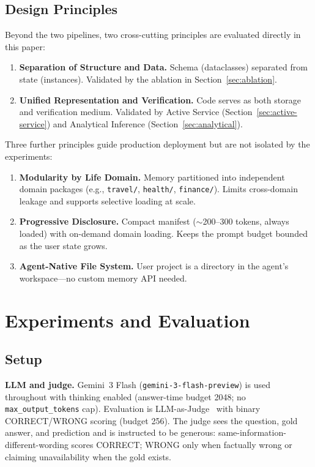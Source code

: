 \subsection{Design Principles}
\label{sec:principles}

Beyond the two pipelines, two cross-cutting principles are evaluated directly in this paper:

\begin{enumerate}[leftmargin=*]
\item \textbf{Separation of Structure and Data.} Schema (dataclasses) separated from state (instances). Validated by the ablation in Section~\ref{sec:ablation}.
\item \textbf{Unified Representation and Verification.} Code serves as both storage and verification medium. Validated by Active Service (Section~\ref{sec:active-service}) and Analytical Inference (Section~\ref{sec:analytical}).
\end{enumerate}

Three further principles guide production deployment but are not isolated by the experiments:

\begin{enumerate}[leftmargin=*,start=3]
\item \textbf{Modularity by Life Domain.} Memory partitioned into independent domain packages (e.g., \texttt{travel/}, \texttt{health/}, \texttt{finance/}). Limits cross-domain leakage and supports selective loading at scale.
\item \textbf{Progressive Disclosure.} Compact manifest ($\sim$200--300 tokens, always loaded) with on-demand domain loading. Keeps the prompt budget bounded as the user state grows.
\item \textbf{Agent-Native File System.} User project is a directory in the agent's workspace---no custom memory API needed.
\end{enumerate}


\section{Experiments and Evaluation}
\label{sec:experiments}

\subsection{Setup}

\textbf{LLM and judge.} Gemini~3 Flash (\texttt{gemini-3-flash-preview}) is used throughout with thinking enabled (answer-time budget 2048; no \texttt{max\_output\_tokens} cap). Evaluation is LLM-as-Judge~\citep{zheng2023mtbench} with binary CORRECT/WRONG scoring (budget 256). The judge sees the question, gold answer, and prediction and is instructed to be generous: same-information-different-wording scores CORRECT; WRONG only when factually wrong or claiming unavailability when the gold exists.

